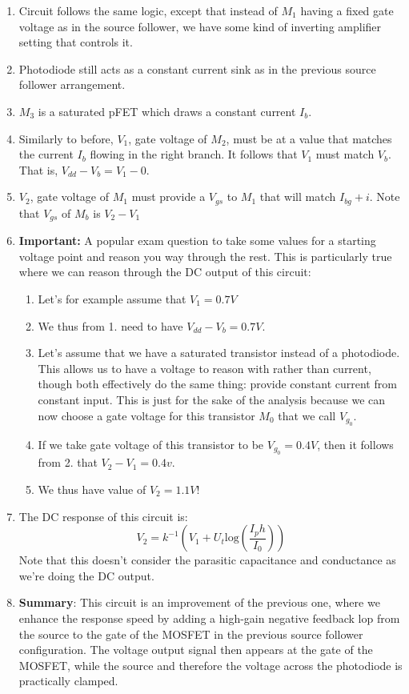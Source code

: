 \begin{enumerate}
    \item Circuit follows the same logic, except that instead of $M_1$ having a fixed gate voltage as in the source follower, we have some kind of inverting amplifier setting that controls it. 
    \item Photodiode still acts as a constant current sink as in the previous source follower arrangement.
    \item $M_3$ is a saturated pFET which draws a constant current $I_b$. 
    \item Similarly to before, $V_1$, gate voltage of $M_2$, must be at a value that matches the current $I_b$ flowing in the right branch. It follows that $V_1$ must match $V_b$. That is, $V_{dd} - V_b = V_1 - 0$.
    \item $V_2$, gate voltage of $M_1$ must provide a $V_{gs}$ to $M_1$ that will match $I_{bg} + i$. Note that $V_{gs}$ of $M_b$ is $V_2 - V_1$
    \item \textbf{Important:} A popular exam question to take some values for a starting voltage point and reason you way through the rest. This is particularly true where we can reason through the DC output of this circuit: 
    \begin{enumerate}
        \item Let's for example assume that $V_1 = 0.7V$
        \item We thus from 1. need to have $V_{dd} - V_b = 0.7V$.
        \item Let's assume that we have a saturated transistor instead of a photodiode. This allows us to have a voltage to reason with rather than current, though both effectively do the same thing: provide constant current from constant input. This is just for the sake of the analysis because we can now choose a gate voltage for this transistor $M_0$ that we call $V_{g_0}$.
        \item If we take gate voltage of this transistor to be $V_{g_0} = 0.4 V$, then it follows from 2. that $V_2 - V_1 = 0.4 v$. 
        \item We thus have value of $V_2 = 1.1 V$! 
    \end{enumerate}
    \item The DC response of this circuit is: 
    \begin{equation}
        V_2 = k^{-1}(V_1 + U_t\mathrm{log}(\frac{I_ph}{I_0}))
    \end{equation}
    Note that this doesn't consider the parasitic capacitance and conductance as we're doing the DC output. 
    \item \textbf{Summary}: This circuit is an improvement of the previous one, where we enhance the response speed by adding a high-gain negative feedback lop from the source to the gate of the MOSFET in the previous source follower configuration. The voltage output signal then appears at the gate of the MOSFET, while the source and therefore the voltage across the photodiode is practically clamped.
\end{enumerate}

